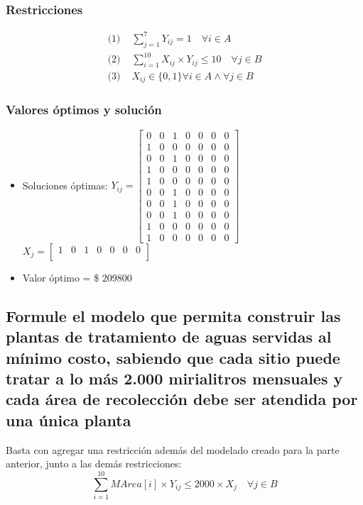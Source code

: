 \documentclass[a4paper,12pt]{article}
\begin{document}
\subsubsection{Restricciones}
\begin{equation*}
	\begin{split}
		\text{(1) }&\sum_{j=1}^{7}Y_{ij}=1\quad \forall i\in A\\
		\text{(2) }&\sum_{i=1}^{10}X_{ij}\times Y_{ij}\leq 10\quad \forall j\in B\\
		\text{(3) }&X_{ij}\in\{0,1\}\forall i\in A \wedge \forall j\in B
	\end{split}
\end{equation*}
\subsubsection{Valores óptimos y solución}
\begin{itemize}
	\item Soluciones óptimas: $Y_{ij}=
	\begin{bmatrix}
	0 & 0 & 1 & 0 & 0 & 0 & 0\\
	1 & 0 & 0 & 0 & 0 & 0 & 0\\
	0 & 0 & 1 & 0 & 0 & 0 & 0\\
	1 & 0 & 0 & 0 & 0 & 0 & 0\\
	1 & 0 & 0 & 0 & 0 & 0 & 0\\
	0 & 0 & 1 & 0 & 0 & 0 & 0\\
	0 & 0 & 1 & 0 & 0 & 0 & 0\\
	0 & 0 & 1 & 0 & 0 & 0 & 0\\
	1 & 0 & 0 & 0 & 0 & 0 & 0\\
	1 & 0 & 0 & 0 & 0 & 0 & 0
	\end{bmatrix}$\\
	
	$X_{j}=
	\begin{bmatrix}
	1 & 0 & 1 & 0 & 0 & 0 & 0\\
	\end{bmatrix}$
	\item Valor óptimo = \$ 209800
\end{itemize}
\subsection{Formule  el  modelo  que  permita  construir  las  plantas  de  tratamiento  de  aguas  servidas  al  mínimo  costo, sabiendo que cada sitio puede  tratar a lo más 2.000 mirialitros mensuales y cada área de recolección debe ser atendida por una única planta}
Basta con agregar una restricción además del modelado creado para la parte anterior, junto a las demás restricciones:
\begin{equation*}
	\sum_{i=1}^{10}MArea[i]\times Y_{ij}\leq 2000\times X_j \quad \forall j \in B
\end{equation*}
\end{document}
